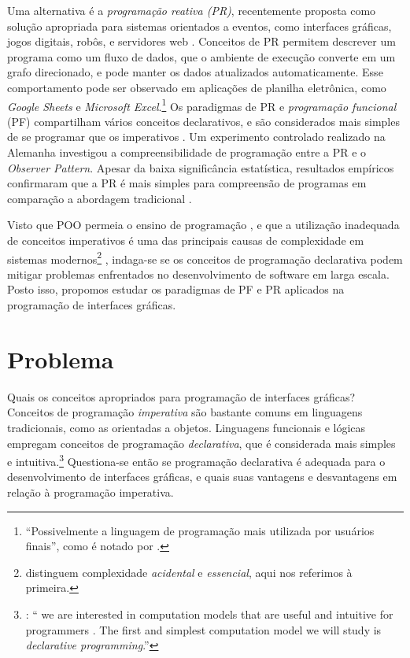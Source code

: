 Uma alternativa é a \emph{programação reativa (PR)}, recentemente proposta como
solução apropriada para sistemas orientados a eventos, como interfaces gráficas,
jogos digitais, robôs, e servidores web \cite{salvaneschi2015,bainomugisha2013}.
Conceitos de PR permitem descrever um programa como um fluxo de dados, que o
ambiente de execução converte em um grafo direcionado, e pode manter os dados
atualizados automaticamente.
Esse comportamento pode ser observado em aplicações de planilha eletrônica, como
\emph{Google Sheets} e \emph{Microsoft Excel}.\footnote{“Possivelmente a linguagem de programação mais utilizada por
usuários finais”, como é notado por \textcite[p. 2]{bainomugisha2013}.}
Os paradigmas de PR e \emph{programação funcional} (PF) compartilham vários conceitos
declarativos, e são considerados mais simples de se programar que os imperativos
\cite{blackheath2016,bainomugisha2013}.
Um experimento controlado realizado na Alemanha investigou a compreensibilidade
de programação entre a PR e o \emph{Observer Pattern}.
Apesar da baixa significância estatística, resultados empíricos confirmaram que
a PR é mais simples para compreensão de programas em comparação a abordagem
tradicional \cite{salvaneschi2014}.

Visto que POO permeia o ensino de programação \cite{vanroy2003}, e que a
utilização inadequada de conceitos imperativos é uma das principais causas de
complexidade em sistemas modernos\footnote{\textcite{moseley2006} distinguem complexidade \emph{acidental} e
\emph{essencial}, aqui nos referimos à primeira.} \cite{moseley2006}, indaga-se se
os conceitos de programação declarativa podem mitigar problemas enfrentados no
desenvolvimento de software em larga escala.
Posto isso, propomos estudar os paradigmas de PF e PR aplicados na programação
de interfaces gráficas.

\section{Problema}
\label{sec:orgc86e21b}
Quais os conceitos apropriados para programação de interfaces gráficas?
Conceitos de programação \emph{imperativa} são bastante comuns em linguagens
tradicionais, como as orientadas a objetos.
Linguagens funcionais e lógicas empregam conceitos de programação
\emph{declarativa}, que é considerada mais simples e intuitiva.\footnote{\textcite[p. 31]{roy2004}: “\textelp{} we are interested in
computation models that are useful and intuitive for programmers \textelp{}. The
first and simplest computation model we will study is \emph{declarative
programming}.”}
Questiona-se então se programação declarativa é adequada para o
desenvolvimento de interfaces gráficas, e quais suas vantagens e desvantagens
em relação à programação imperativa.

